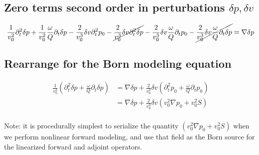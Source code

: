 \documentclass[10pt,fleqn]{article}
\begin{document}
\subsection{Zero terms second order in perturbations $\delta p,\delta v$ }
\begin{equation}
\frac{1}{v_0^2} \partial_t^2 \delta p
+ \frac{1}{v_0^2} \frac{\omega}{Q} \partial_t \delta p
- \frac{2}{v_0^3} \delta v \partial_t^2 p_0
- \cancel{ \frac{2}{v_0^3} \delta v \partial_t^2 \delta p }
- \frac{2}{v_0^3} \delta v \frac{\omega}{Q} \partial_t p_0
- \cancel{ \frac{2}{v_0^3} \delta v \frac{\omega}{Q} \partial_t \delta p }
= \nabla \delta p 
\end{equation}

\subsection{Rearrange for the Born modeling equation}
\begin{equation}
\begin{aligned}
\frac{1}{v_0^2} \left( \partial_t^2 \delta p + \frac{\omega}{Q} \partial_t \delta p \right) 
&= \nabla \delta p + \frac{2}{v_0^3} \delta v \left( \partial_t^2 p_0 + \frac{\omega}{Q} \partial_t p_0 \right) \\[10pt]
&= \nabla \delta p + \frac{2}{v_0^3} \delta v \left( v_0^2 \nabla p_0 + v_0^2 S \right) \\[10pt]
\end{aligned}
\end{equation}

Note: it is procedurally simplest to serialize the quantity $\displaystyle \left( v_0^2 \nabla p_0 + v_0^2 S \right)$ when we perform 
nonlinear forward modeling, and use that field as the Born source for the linearized forward and adjoint operators.
\end{document}
